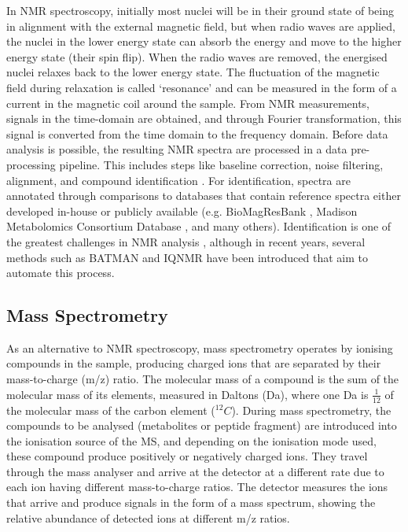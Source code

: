 In NMR spectroscopy, initially most nuclei will be in their ground state of being in alignment with the external magnetic field, but when radio waves are applied, the nuclei in the lower energy state can absorb the energy and move to the higher energy state (their spin flip). When the radio waves are removed, the energised nuclei relaxes back to the lower energy state. The fluctuation of the magnetic field during relaxation is called `resonance' and can be measured in the form of a current in the magnetic coil around the sample. From NMR measurements, signals in the time-domain are obtained, and through Fourier transformation, this signal is converted from the time domain to the frequency domain. Before data analysis is possible, the resulting NMR spectra are processed in a data pre-processing pipeline. This includes steps like baseline correction, noise filtering, alignment, and compound identification \cite{Alonso2015}. For identification, spectra are annotated through comparisons to databases that contain reference spectra either developed in-house or publicly available (e.g. BioMagResBank \cite{Ulrich01012008}, Madison Metabolomics Consortium Database \cite{cui2008metabolite}, and many others). Identification is one of the greatest challenges in NMR analysis \cite{Pan2007}, although in recent years, several methods such as BATMAN \cite{hao2012batman} and IQNMR \cite{song2011iqmnmr} have been introduced that aim to automate this process.

\subsection{Mass Spectrometry}

As an alternative to NMR spectroscopy, mass spectrometry operates by ionising compounds in the sample, producing charged ions that are separated by their mass-to-charge (m/z) ratio. The molecular mass of a compound is the sum of the molecular mass of its elements, measured in Daltons (Da), where one Da is $\frac{1}{12}$ of the molecular mass of the carbon element ($^{12}C$). During mass spectrometry, the compounds to be analysed (metabolites or peptide fragment) are introduced into the ionisation source of the MS, and depending on the ionisation mode used, these compound produce positively or negatively charged ions. They travel through the mass analyser and arrive at the detector at a different rate due to each ion having different mass-to-charge ratios. The detector measures the ions that arrive and produce signals in the form of a mass spectrum, showing the relative abundance of detected ions at different m/z ratios. 


